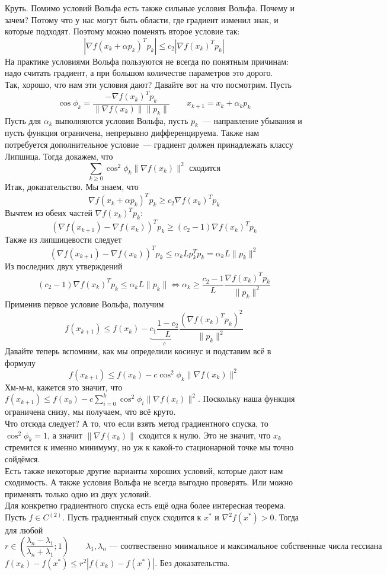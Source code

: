 \documentclass{article}
\begin{document}
    Круть. Помимо условий Вольфа есть также сильные условия Вольфа. Почему и зачем? Потому что у нас могут быть области, где градиент изменил знак, и которые подходят. Поэтому можно поменять второе условие так:
    $$
    |\nabla f(x_k+\alpha p_k)^Tp_k|\leqslant c_2|\nabla f(x_k)^Tp_k|
    $$
    На практике условиями Вольфа пользуются не всегда по понятным причинам: надо считать градиент, а при большом количестве параметров это дорого.\\
    Так, хорошо, что нам эти условия дают? Давайте вот на что посмотрим. Пусть
    $$
    \cos\phi_k=\frac{-\nabla f(x_k)^Tp_k}{\|\nabla f(x_k)\|\|p_k\|}\qquad x_{k+1}=x_k+\alpha_kp_k
    $$
    Пусть для $\alpha_k$ выполняются условия Вольфа, пусть $p_k$~--- направление убывания и пусть функция ограничена, непрерывно дифференцируема. Также нам потребуется дополнительное условие~--- градиент должен принадлежать классу Липшица. Тогда докажем, что
    $$
    \sum\limits_{k\geqslant0}\cos^2\phi_k\|\nabla f(x_k)\|^2\text{ сходится}
    $$
    Итак, доказательство. Мы знаем, что
    $$
    \nabla f(x_k+\alpha p_k)^Tp_k\geqslant c_2\nabla f(x_k)^Tp_k
    $$
    Вычтем из обеих частей $\nabla f(x_k)^Tp_k$:
    $$
    (\nabla f(x_{k+1})-\nabla f(x_k))^Tp_k\geqslant(c_2-1)\nabla f(x_k)^Tp_k
    $$
    Также из липшицевости следует
    $$
    (\nabla f(x_{k+1})-\nabla f(x_k))^Tp_k\leqslant \alpha_kLp_k^Tp_k=\alpha_kL\|p_k\|^2
    $$
    Из последних двух утверждений
    $$
    (c_2-1)\nabla f(x_k)^Tp_k\leqslant\alpha_kL\|p_k\|\Leftrightarrow \alpha_k\geqslant\frac{c_2-1}L\frac{\nabla f(x_k)^Tp_k}{\|p_k\|^2}
    $$
    Применив первое условие Вольфа, получим
    $$
    f(x_{k+1})\leqslant f(x_k)-\underbrace{c_1\frac{1-c_2}L}_c\frac{(\nabla f(x_k)^Tp_k)^2}{\|p_k\|^2}
    $$
    Давайте теперь вспомним, как мы определили косинус и подставим всё в формулу
    $$
    f(x_{k+1})\leqslant f(x_k)-c\cos^2\phi_k\|\nabla f(x_k)\|^2
    $$
    Хм-м-м, кажется это значит, что $f(x_{k+1})\leqslant f(x_0)-c\sum\limits_{i=0}^k\cos^2\phi_i\|\nabla f(x_i)\|^2$. Поскольку наша функция ограничена снизу, мы получаем, что всё круто.\\
    Что отсюда следует? А то, что если взять метод градиентного спуска, то $\cos^2\phi_k=1$, а значит $\|\nabla f(x_k)\|$ сходится к нулю. Это не значит, что $x_k$ стремится к именно минимуму, но уж к какой-то стационарной точке мы точно сойдёмся.\\
    Есть также некоторые другие варианты хороших условий, которые дают нам сходимость. А также условия Вольфа не всегда выгодно проверять. Или можно применять только одно из двух условий.\\
    Для конкретно градиентного спуска есть ещё одна более интересная теорема. Пусть $f\in C^{(2)}$. Пусть градиентный спуск сходится к $x^*$ и $\nabla^2 f(x^*)>0$. Тогда для любой
    $$
    r\in\left(\frac{\lambda_n-\lambda_1}{\lambda_n+\lambda_1};1\right)\qquad \lambda_1,\lambda_n\text{~--- соотвественно миимальное и максимальное собственные числа гессиана}
    $$
    $f(x_{k})-f(x^*)\leqslant r^2|f(x_k)-f(x^*)|$. Без доказательства.
\end{document}
